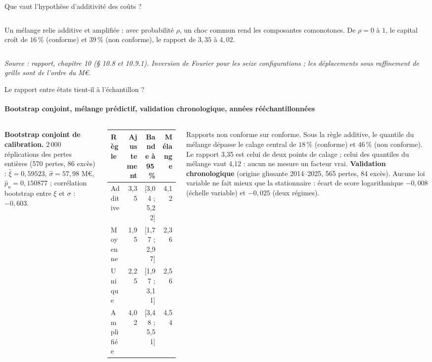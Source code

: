 \documentclass[aspectratio=169,10pt,t]{beamer}
\newcommand{\source}[1]{\par\vfill{\tiny\color{gris}\textit{Source : #1}}\par\vspace{-1mm}}
\renewcommand{\arraystretch}{1.25}
\begin{document}
\begin{frame}{Que vaut l'hypothèse d'additivité des coûts ?}
\begin{columns}[T,onlytextwidth]
    Un mélange relie additive et amplifiée : avec probabilité $\rho$, un choc commun rend les composantes comonotones. De $\rho=0$ à $1$, le capital croît de $16\,\%$ (conforme) et $39\,\%$ (non conforme), le rapport de $3{,}35$ à $4{,}02$.
  \end{columns}
  \source{rapport, chapitre 10 (§ 10.8 et 10.9.1). Inversion de Fourier pour les seize configurations ; les déplacements sous raffinement de grille sont de l'ordre du M€.}
\end{frame}

\begin{frame}{Le rapport entre états tient-il à l'échantillon ?}
  \suivimethode{}{}
  \framesubtitle{\ajout Bootstrap conjoint, mélange prédictif, validation chronologique, années rééchantillonnées}
  \begin{columns}[T,onlytextwidth]
    \scriptsize
    \textbf{Bootstrap conjoint de calibration.} 2\,000 réplications des pertes entières (570 pertes, 86 excès) : $\hat\xi=0{,}59523$, $\hat\sigma=57{,}98$ M€, $\hat p_u=0{,}150877$ ; corrélation bootstrap entre $\xi$ et $\sigma$ : $-0{,}603$.\par\vspace{1mm}
    \renewcommand{\arraystretch}{1.1}
    \begin{tabular}{@{}l r r r@{}}
      \toprule
      Règle & Ajustement & Bande à 95\,\% & Mélange \\
      \midrule
      Additive & 3,35 & [3,04 ; 5,22] & 4,12 \\
      \rowcolor{clair}Moyenne & 1,95 & [1,77 ; 2,97] & 2,36 \\
      Unique & 2,25 & [1,97 ; 3,11] & 2,56 \\
      \rowcolor{clair}Amplifiée & 4,02 & [3,48 ; 5,51] & 4,54 \\
      \bottomrule
    \end{tabular}\par\vspace{1mm}
    Rapports non conforme sur conforme. Sous la règle additive, le quantile du mélange dépasse le calage central de $18\,\%$ (conforme) et $46\,\%$ (non conforme). Le rapport 3,35 est celui de deux points de calage ; celui des quantiles du mélange vaut 4,12 : aucun ne mesure un facteur vrai.
    \scriptsize
    \textbf{Validation chronologique} (origine glissante 2014--2025, 565 pertes, 84 excès). Aucune loi variable ne fait mieux que la stationnaire : écart de score logarithmique $-0{,}008$ (échelle variable) et $-0{,}025$ (deux régimes).\par\vspace{1mm}

\end{columns}
\end{frame}
\end{document}
